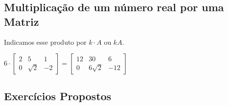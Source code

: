 \subsection{Multiplicação de um número real por uma Matriz}


  Indicamos esse produto por $k \cdot A \text{ ou } kA $.
\begin{example}
  $6 \cdot \begin{bmatrix}
    2 & 5 & 1 \\
    0 & \sqrt{2} & -2
  \end{bmatrix} = \begin{bmatrix}
    12 & 30 & 6 \\
    0 & 6\sqrt{2} & -12
  \end{bmatrix}$
\end{example}

\newpage
\subsection{Exercícios Propostos}

